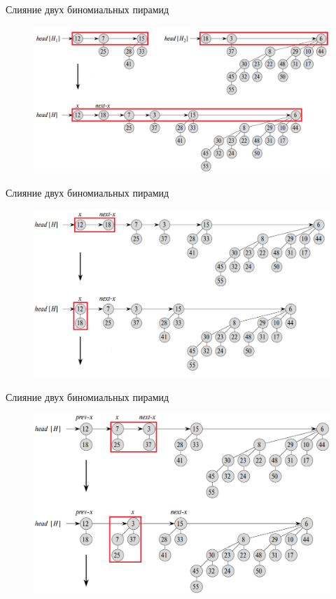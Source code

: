 \begin{frame}{Слияние двух биномиальных пирамид}
	\begin{figure}
		\includegraphics[width=0.9\linewidth]{images/binom-heap-union0.png}
	\end{figure}
\end{frame}

\begin{frame}{Слияние двух биномиальных пирамид}
	\begin{figure}
		\includegraphics[width=0.9\linewidth]{images/binom-heap-union1.png}
	\end{figure}
\end{frame}

\begin{frame}{Слияние двух биномиальных пирамид}
	\begin{figure}
		\includegraphics[width=0.85\linewidth]{images/binom-heap-union2.png}
	\end{figure}
\end{frame}

